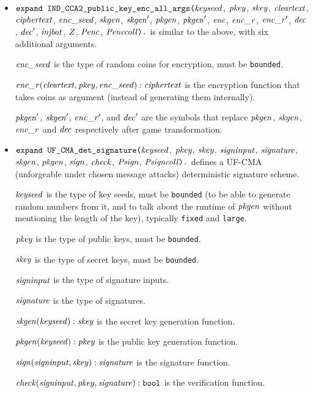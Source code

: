 \documentclass{article}
\begin{document}
\begin{itemize}
\item $\texttt{expand IND\_CCA2\_public\_key\_enc\_all\_args(}\mathit{keyseed}$, $\mathit{pkey}$, $\mathit{skey}$,
$  \mathit{cleartext}$, $\mathit{ciphertext}$, $\mathit{enc\_seed}$, $\mathit{skgen}$, $\mathit{skgen}'$, $\mathit{pkgen}$, $\mathit{pkgen}'$, $\mathit{enc}$, $\mathit{enc\_r}$, $\mathit{enc\_r}'$, $\mathit{dec}$, $\mathit{dec}'$, $\mathit{injbot}$, $\mathit{Z}$, $\mathit{Penc}$, $\mathit{Penccoll}\texttt{).}$ is similar to the above,
  with six additional arguments. 

  $\mathit{enc\_seed}$ is the type of random coins for encryption, must be \texttt{bounded}.

  $\mathit{enc\_r}(\mathit{cleartext}, \mathit{pkey}, \mathit{enc\_seed}): \mathit{ciphertext}$ is the encryption function that takes coins as argument (instead of generating them internally).

  $\mathit{pkgen}'$, $\mathit{skgen}'$, $\mathit{enc\_r}'$, and $\mathit{dec}'$ are the symbols that replace $\mathit{pkgen}$, $\mathit{skgen}$, $\mathit{enc\_r}$ and $\mathit{dec}$ respectively after game transformation.

\item $\texttt{expand UF\_CMA\_det\_signature(}\mathit{keyseed}$, $\mathit{pkey}$, $\mathit{skey}$,
$  \mathit{signinput}$, $\mathit{signature}$, $\mathit{skgen}$, $\mathit{pkgen}$, $\mathit{sign}$, $
  \mathit{check}$, $\mathit{Psign}$, $\mathit{Psigncoll}\texttt{).}$ defines a
  UF-CMA (unforgeable under chosen message attacks)
  deterministic signature scheme.

   $\mathit{keyseed}$ is the type of key seeds, must be \texttt{bounded} (to be able to generate random numbers from it, and to talk about
  the runtime of $\mathit{pkgen}$ without mentioning the length of the key), typically \texttt{fixed} and \texttt{large}.

   $\mathit{pkey}$ is the type of public keys, must be \texttt{bounded}.

   $\mathit{skey}$ is the type of secret keys, must be \texttt{bounded}.

  $\mathit{signinput}$ is the type of signature inputs.

   $\mathit{signature}$ is the type of signatures.

   $\mathit{skgen}(\mathit{keyseed}): \mathit{skey}$ is the secret key generation function.

   $\mathit{pkgen}(\mathit{keyseed}): \mathit{pkey}$ is the public key generation function.

   $\mathit{sign}(\mathit{signinput}, \mathit{skey}): \mathit{signature}$ is the signature function.

   $\mathit{check}(\mathit{signinput}, \mathit{pkey}, \mathit{signature}): \texttt{bool}$ is the
  verification function.


\end{itemize}
\end{document}
